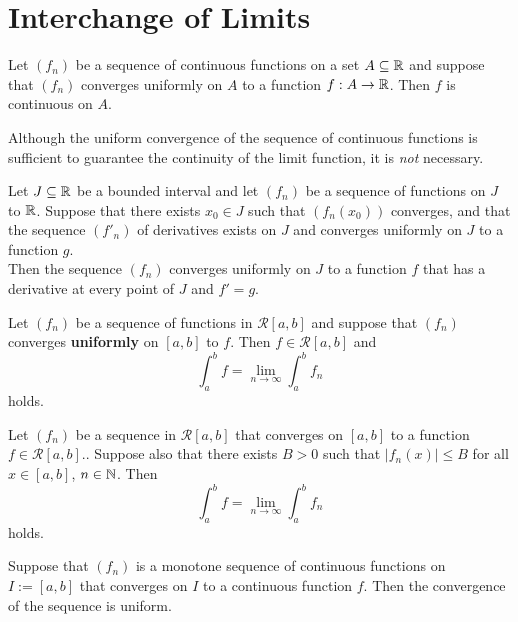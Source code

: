 \section{Interchange of Limits}

\begin{theorem}
	Let $(f_n)$ be a sequence of continuous functions on a set $A \subseteq \mathbb{R}$ and suppose that $(f_n)$ converges uniformly on $A$ to a function $f:A \to \mathbb{R}$. Then $f$ is continuous on $A$.
\end{theorem}

\begin{remark}
	Although the uniform convergence of the sequence of continuous functions is sufficient to guarantee the continuity of the limit function, it is \textit{not} necessary.
\end{remark}

\begin{theorem}
	Let $J \subseteq \mathbb{R}$ be a bounded interval and let $(f_n)$ be a sequence of functions on $J$ to $\mathbb{R}$. Suppose that there exists $x_0 \in J$ such that $(f_n(x_0))$ converges, and that the sequence $(f'_n)$ of derivatives exists on $J$ and converges uniformly on $J$ to a function $g$.
	\\Then the sequence $(f_n)$ converges uniformly on $J$ to a function $f$ that has a derivative at every point of $J$ and $f'=g$.
\end{theorem}

\begin{theorem}
	Let $(f_n)$ be a sequence of functions in $\mathcal{R}[a,b]$ and suppose that $(f_n)$ converges \textbf{uniformly} on $[a,b]$ to $f$. Then $f \in \mathcal{R}[a,b]$ and
	\[\displaystyle\int_{a}^{b}f=\lim\limits_{n \to \infty}\displaystyle\int_{a}^{b}f_n\]
	holds.
\end{theorem}

\begin{theorem}
	Let $(f_n)$ be a sequence in $\mathcal{R}[a,b]$ that converges on $[a,b]$ to a function $f \in \mathcal{R}[a,b]$.. Suppose also that there exists $B >0$ such that $|f_n(x)|\leq B$ for all $x \in [a,b]$, $n \in \mathbb{N}$. Then
	\[\displaystyle\int_{a}^{b}f=\lim\limits_{n \to \infty}\displaystyle\int_{a}^{b} f_n\]
	holds.
\end{theorem}

\begin{theorem}
	Suppose that $(f_n)$ is a monotone sequence of continuous functions on $I:=[a,b]$ that converges on $I$ to a continuous function $f$. Then the convergence of the sequence is uniform.
\end{theorem}
